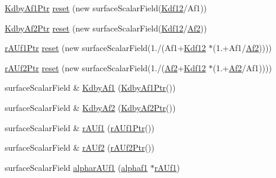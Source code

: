 \begin{DoxyCompactItemize}
\item 
\hyperlink{pEqnf__2p_8H_ab519c6d0ec326c4166a5238ad1a75281}{Kdby\+Af1\+Ptr} \hyperlink{pEqnf__2p_8H_a7bf1549d8945bd2c90fcdd2524bd2079}{reset} (new surface\+Scalar\+Field(\hyperlink{pEqnf__2p_8H_a92926bf08983bca8c8d3bdade64d24c2}{Kdf12}/Af1))
\item 
\hyperlink{pEqnf__2p_8H_a2ada986b644f6ca4d3739c7cd72db448}{Kdby\+Af2\+Ptr} \hyperlink{pEqnf__2p_8H_a5a0dd54c80692ad662a75f8203a47f15}{reset} (new surface\+Scalar\+Field(\hyperlink{pEqnf__2p_8H_a92926bf08983bca8c8d3bdade64d24c2}{Kdf12}/\hyperlink{pEqnf__2p_8H_a2609adcc1d02fc916d8e7d77a9b6e4cc}{Af2}))
\item 
\hyperlink{pEqnf__2p_8H_a45cd567de66687731018bd57ba4895b4}{r\+A\+Uf1\+Ptr} \hyperlink{pEqnf__2p_8H_a608e33c95cb391d714ea0d61f73c22d1}{reset} (new surface\+Scalar\+Field(1./(Af1+\hyperlink{pEqnf__2p_8H_a92926bf08983bca8c8d3bdade64d24c2}{Kdf12} $\ast$(1.+Af1/\hyperlink{pEqnf__2p_8H_a2609adcc1d02fc916d8e7d77a9b6e4cc}{Af2}))))
\item 
\hyperlink{pEqnf__2p_8H_afd2f9cb3bfb4ff4a3ca384fedd285ec9}{r\+A\+Uf2\+Ptr} \hyperlink{pEqnf__2p_8H_ac7e3c444c6631a56dd742955ee4c3e2a}{reset} (new surface\+Scalar\+Field(1./(\hyperlink{pEqnf__2p_8H_a2609adcc1d02fc916d8e7d77a9b6e4cc}{Af2}+\hyperlink{pEqnf__2p_8H_a92926bf08983bca8c8d3bdade64d24c2}{Kdf12} $\ast$(1.+\hyperlink{pEqnf__2p_8H_a2609adcc1d02fc916d8e7d77a9b6e4cc}{Af2}/Af1))))
\item 
surface\+Scalar\+Field \& \hyperlink{pEqnf__2p_8H_a17310029adb03eb9492c209804d89f41}{Kdby\+Af1} (\hyperlink{pEqnf__2p_8H_ab519c6d0ec326c4166a5238ad1a75281}{Kdby\+Af1\+Ptr}())
\item 
surface\+Scalar\+Field \& \hyperlink{pEqnf__2p_8H_ab7a4fc4ee3f50aa316a32f9fe8a69e55}{Kdby\+Af2} (\hyperlink{pEqnf__2p_8H_a2ada986b644f6ca4d3739c7cd72db448}{Kdby\+Af2\+Ptr}())
\item 
surface\+Scalar\+Field \& \hyperlink{pEqnf__2p_8H_afe937f556d00eb62aa6152533edebec5}{r\+A\+Uf1} (\hyperlink{pEqnf__2p_8H_a45cd567de66687731018bd57ba4895b4}{r\+A\+Uf1\+Ptr}())
\item 
surface\+Scalar\+Field \& \hyperlink{pEqnf__2p_8H_af4fa7f5a39d79ab8eb0a15cec0eb266a}{r\+A\+Uf2} (\hyperlink{pEqnf__2p_8H_afd2f9cb3bfb4ff4a3ca384fedd285ec9}{r\+A\+Uf2\+Ptr}())
\item 
surface\+Scalar\+Field \hyperlink{pEqnf__2p_8H_aefc84bdeaa95a5fb10aa1d8c927a1dcd}{alphar\+A\+Uf1} (\hyperlink{refsAndControls__2p_8H_af5ff2b878e8d79c2bd7cf5385f55ea99}{alphaf1} $\ast$\hyperlink{pEqnf__2p_8H_afe937f556d00eb62aa6152533edebec5}{r\+A\+Uf1})

\end{DoxyCompactItemize}
